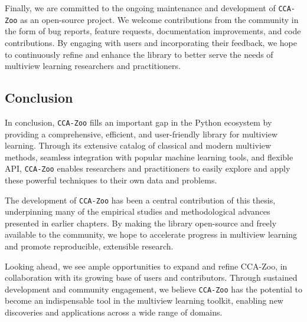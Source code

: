 Finally, we are committed to the ongoing maintenance and development of \texttt{CCA-Zoo} as an open-source project. We welcome contributions from the community in the form of bug reports, feature requests, documentation improvements, and code contributions. By engaging with users and incorporating their feedback, we hope to continuously refine and enhance the library to better serve the needs of multiview learning researchers and practitioners.

\subsection{Conclusion}

In conclusion, \texttt{CCA-Zoo} fills an important gap in the Python ecosystem by providing a comprehensive, efficient, and user-friendly library for multiview learning. Through its extensive catalog of classical and modern multiview methods, seamless integration with popular machine learning tools, and flexible API, \texttt{CCA-Zoo} enables researchers and practitioners to easily explore and apply these powerful techniques to their own data and problems.

The development of \texttt{CCA-Zoo} has been a central contribution of this thesis, underpinning many of the empirical studies and methodological advances presented in earlier chapters. By making the library open-source and freely available to the community, we hope to accelerate progress in multiview learning and promote reproducible, extensible research.

Looking ahead, we see ample opportunities to expand and refine CCA-Zoo, in collaboration with its growing base of users and contributors. Through sustained development and community engagement, we believe \texttt{CCA-Zoo} has the potential to become an indispensable tool in the multiview learning toolkit, enabling new discoveries and applications across a wide range of domains.